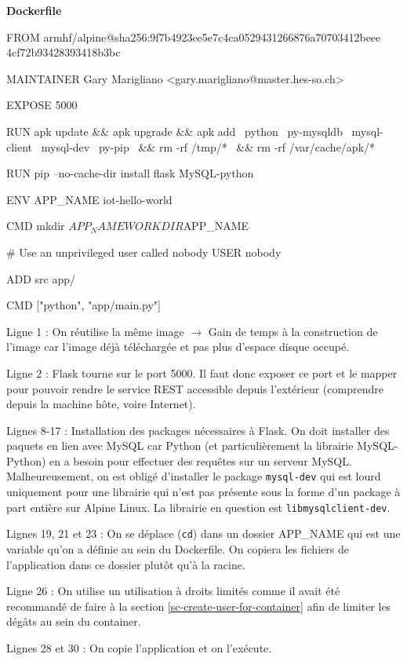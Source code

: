 \documentclass[11pt,a4paper,oneside]{report}
\newcommand{\code}[1]{\texttt{#1}}
\begin{document}
\textbf{Dockerfile}
\begin{bashcode}
FROM armhf/alpine@sha256:9f7b4923ee5e7c4ca0529431266876a70703412beee
4cf72b93428393418b3bc

MAINTAINER Gary Marigliano <gary.marigliano@master.hes-so.ch>

EXPOSE 5000

RUN apk update && apk upgrade && apk add \
  python \
  py-mysqldb \
  mysql-client \
  mysql-dev \
  py-pip \
  && rm -rf /tmp/* \
  && rm -rf /var/cache/apk/*

RUN pip --no-cache-dir install flask MySQL-python

ENV APP_NAME iot-hello-world

CMD mkdir ${APP_NAME}

WORKDIR ${APP_NAME}

# Use an unprivileged user called nobody
USER nobody

ADD src app/

CMD ["python", "app/main.py"]
\end{bashcode}

Ligne 1 : On réutilise la même image $ \to $ Gain de temps à la construction de l'image car l'image déjà téléchargée et pas plus d'espace disque occupé.

Ligne 2 : Flask tourne sur le port 5000. Il faut donc exposer ce port et le mapper pour pouvoir rendre le service REST accessible depuis l'extérieur (comprendre depuis la machine hôte, voire Internet).

Lignes 8-17 : Installation des packages nécessaires à Flask. On doit installer des paquets en lien avec MySQL car Python (et particulièrement la librairie MySQL-Python) en a besoin pour effectuer des requêtes sur un serveur MySQL. Malheureusement, on est obligé d'installer le package \code{mysql-dev} qui est lourd uniquement pour une librairie qui n'est pas présente sous la forme d'un package à part entière sur Alpine Linux. La librairie en question est  \code{libmysqlclient-dev}\cite{bug_mysql_alpine}.

Lignes 19, 21 et 23 : On se déplace (\code{cd}) dans un dossier APP\_NAME qui est une variable qu'on a définie au sein du Dockerfile. On copiera les fichiers de l'application dans ce dossier plutôt qu'à la racine.

Ligne 26 : On utilise un utilisation à droits limités comme il avait été recommandé de faire à la section \ref{sc-create-user-for-container} afin de limiter les dégâts au sein du container.

Lignes 28 et 30 : On copie l'application et on l'exécute.
\end{document}
